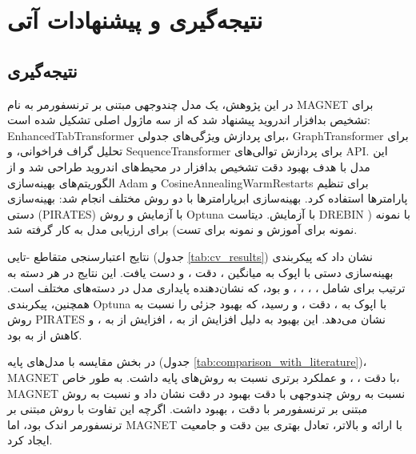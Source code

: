 \clearpage
\thispagestyle{empty}
\chapter{نتیجه‌گیری و پیشنهادات آتی}\label{chap5}

\section{نتیجه‌گیری}
در این پژوهش، یک مدل چندوجهی مبتنی بر ترنسفورمر به نام MAGNET برای تشخیص بدافزار اندروید پیشنهاد شد که از سه ماژول اصلی تشکیل شده است: EnhancedTabTransformer برای پردازش ویژگی‌های جدولی، GraphTransformer برای تحلیل گراف فراخوانی، و SequenceTransformer برای پردازش توالی‌های API. این مدل با هدف بهبود دقت تشخیص بدافزار در محیط‌های اندروید طراحی شد و از الگوریتم‌های بهینه‌سازی Adam و CosineAnnealingWarmRestarts برای تنظیم پارامترها استفاده کرد. بهینه‌سازی ابرپارامترها با دو روش مختلف انجام شد: بهینه‌سازی دستی (PIRATES) با  آزمایش و روش Optuna \cite{Optuna2019} با  آزمایش. دیتاست DREBIN \cite{Drebin} با  نمونه ( نمونه برای آموزش و  نمونه برای تست) برای ارزیابی مدل به کار گرفته شد.

نتایج اعتبارسنجی متقاطع -تایی (جدول \ref{tab:cv_results}) نشان داد که پیکربندی بهینه‌سازی دستی با  اپوک به میانگین  ، دقت ، و   دست یافت. این نتایج در هر دسته به ترتیب برای  شامل ، ، ، ، و  بود، که نشان‌دهنده پایداری مدل در دسته‌های مختلف است. همچنین، پیکربندی Optuna با  اپوک به  ، دقت ، و   رسید، که بهبود جزئی را نسبت به روش PIRATES نشان می‌دهد. این بهبود به دلیل افزایش  از  به ، افزایش  از  به ، و کاهش  از  به  بود.

در بخش مقایسه با مدل‌های پایه (جدول \ref{tab:comparison_with_literature})، MAGNET با دقت ،  ، و   عملکرد برتری نسبت به روش‌های پایه داشت. به طور خاص، MAGNET نسبت به روش چندوجهی \cite{Alsaleh2023} با دقت  بهبود  در دقت نشان داد و نسبت به روش مبتنی بر ترنسفورمر \cite{TransformerMalware} با دقت ، بهبود  داشت. اگرچه این تفاوت با روش مبتنی بر ترنسفورمر اندک بود، اما MAGNET با ارائه  و  بالاتر، تعادل بهتری بین دقت و جامعیت ایجاد کرد.

